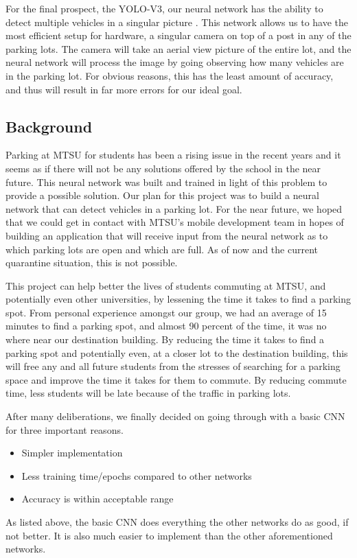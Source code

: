 \documentclass[conference]{IEEEtran}
\begin{document}
For the final prospect, the YOLO-V3, our neural network has the ability to detect multiple vehicles in a singular picture \cite{b1}. This network allows us to have the most efficient setup for hardware, a singular camera on top of a post in any of the parking lots. The camera will take an aerial view picture of the entire lot, and the neural network will process the image by going observing how many vehicles are in the parking lot. For obvious reasons, this has the least amount of accuracy, and thus will result in far more errors for our ideal goal.

\subsection{Background}

Parking at MTSU for students has been a rising issue in the recent years and it seems as if there will not be any solutions offered by the school in the near future. This neural network was built and trained in light of this problem to provide a possible solution. Our plan for this project was to build a neural network that can detect vehicles in a parking lot. For the near future, we hoped that we could get in contact with MTSU's mobile development team in hopes of building an application that will receive input from the neural network as to which parking lots are open and which are full. As of now and the current quarantine situation, this is not possible.

This project can help better the lives of students commuting at MTSU, and potentially even other universities, by lessening the time it takes to find a parking spot. From personal experience amongst our group, we had an average of 15 minutes to find a parking spot, and almost 90 percent of the time, it was no where near our destination building. By reducing the time it takes to find a parking spot and potentially even, at a closer lot to the destination building, this will free any and all future students from the stresses of searching for a parking space and improve the time it takes for them to commute. By reducing commute time, less students will be late because of the traffic in parking lots.

After many deliberations, we finally decided on going through with a basic CNN for three important reasons. 
\begin{itemize}
    \item Simpler implementation 
    \item Less training time/epochs compared to other networks
    \item Accuracy is within acceptable range
\end{itemize}
As listed above, the basic CNN does everything the other networks do as good, if not better. It is also much easier to implement than the other aforementioned networks. 
\end{document}
